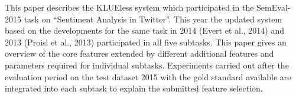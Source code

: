This paper describes the KLUEless system which participated in the SemEval-2015 task on ``Sentiment Analysis in Twitter''. This year the updated system based on the developments for the same task in 2014 (Evert et al., 2014) and 2013 (Proisl et al., 2013) participated in all five subtasks. This paper gives an overview of the core features extended by different additional features and parameters required for individual subtasks. Experiments carried out after the evaluation period on the test dataset 2015 with the gold standard available are integrated into each subtask to explain the submitted feature selection.
